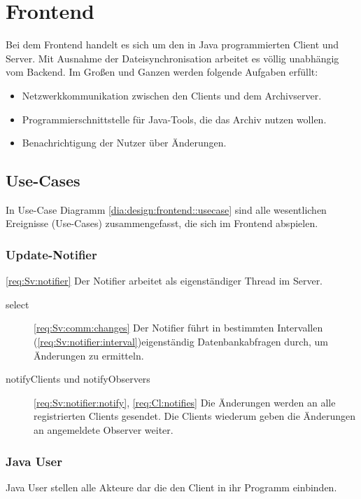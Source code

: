 \chapter{Frontend}
Bei dem Frontend handelt es sich um den in Java programmierten Client und Server.
Mit Ausnahme der Dateisynchronisation arbeitet es völlig unabhängig vom Backend.
Im Großen und Ganzen werden folgende Aufgaben erfüllt:
\begin{itemize}
	\item Netzwerkkommunikation zwischen den Clients und dem Archivserver.
	\item Programmierschnittstelle für Java-Tools, die das Archiv nutzen wollen.
	\item Benachrichtigung der Nutzer über Änderungen.
\end{itemize}
\section{Use-Cases}
In Use-Case Diagramm \ref{dia:design:frontend::usecase} sind alle wesentlichen Ereignisse (Use-Cases) zusammengefasst, die sich im Frontend abspielen.
\subsection{Update-Notifier} \ref{req:Sv:notifier}
Der Notifier arbeitet als eigenständiger Thread im Server.
\begin{description}
	\item [select] 
		\ref{req:Sv:comm:changes}
		Der Notifier führt in bestimmten Intervallen (\ref{req:Sv:notifier:interval})eigenständig Datenbankabfragen durch,
		um Änderungen zu ermitteln.
	\item [notifyClients und notifyObservers] \ref{req:Sv:notifier:notify},
		\ref{req:Cl:notifies}
		Die Änderungen werden an alle registrierten Clients gesendet.
		Die Clients wiederum geben die Änderungen an angemeldete Observer weiter.
\end{description}

\subsection{Java User} \label{design:frontend:usecase:user}
Java User stellen alle Akteure dar die den Client in ihr Programm einbinden. 

